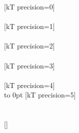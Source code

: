 [kT precision=0]%
\\ [10pt]\makebox[\linewidth][c]{\scalebox{.6}{\pgfPT[kT precision=0]}}%
\\ [10pt][kT precision=1]%
\\ [10pt]\makebox[\linewidth][c]{\scalebox{.6}{\pgfPT[kT precision=1]}}%
\\ [10pt][kT precision=2]%
\\ [10pt]\makebox[\linewidth][c]{\scalebox{.6}{\pgfPT[kT precision=2]}}%
\\ [10pt][kT precision=3]%
\\ [10pt]\makebox[\linewidth][c]{\scalebox{.6}{\pgfPT[kT precision=3]}}%
\\ [10pt][kT precision=4]%
\\ [0pt]\vbox to 0pt{\makebox[\linewidth][c]{\scalebox{.6}{\pgfPT[kT precision=4]}}}%
\newpage%
[kT precision=5]%
\\ [10pt]\makebox[\linewidth][c]{\scalebox{.6}{\pgfPT[kT precision=5]}}%
\\ [0pt]\pgfPTendoption%
\\ [10pt][]%
\pgfPTresetstyle%
\endinput
